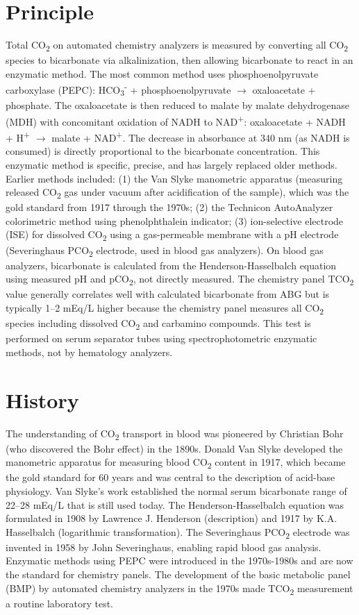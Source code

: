 \section*{Principle}
Total CO\textsubscript{2} on automated chemistry analyzers is measured by converting all CO\textsubscript{2} species to bicarbonate via alkalinization, then allowing bicarbonate to react in an enzymatic method. The most common method uses phosphoenolpyruvate carboxylase (PEPC): HCO\textsubscript{3}\textsuperscript{-} + phosphoenolpyruvate $\rightarrow$ oxaloacetate + phosphate. The oxaloacetate is then reduced to malate by malate dehydrogenase (MDH) with concomitant oxidation of NADH to NAD\textsuperscript{+}: oxaloacetate + NADH + H\textsuperscript{+} $\rightarrow$ malate + NAD\textsuperscript{+}. The decrease in absorbance at 340 nm (as NADH is consumed) is directly proportional to the bicarbonate concentration. This enzymatic method is specific, precise, and has largely replaced older methods. Earlier methods included: (1) the Van Slyke manometric apparatus (measuring released CO\textsubscript{2} gas under vacuum after acidification of the sample), which was the gold standard from 1917 through the 1970s; (2) the Technicon AutoAnalyzer colorimetric method using phenolphthalein indicator; (3) ion-selective electrode (ISE) for dissolved CO\textsubscript{2} using a gas-permeable membrane with a pH electrode (Severinghaus PCO\textsubscript{2} electrode, used in blood gas analyzers). On blood gas analyzers, bicarbonate is calculated from the Henderson-Hasselbalch equation using measured pH and pCO\textsubscript{2}, not directly measured. The chemistry panel TCO\textsubscript{2} value generally correlates well with calculated bicarbonate from ABG but is typically 1--2 mEq/L higher because the chemistry panel measures all CO\textsubscript{2} species including dissolved CO\textsubscript{2} and carbamino compounds. This test is performed on serum separator tubes using spectrophotometric enzymatic methods, not by hematology analyzers.

\section*{History}
The understanding of CO\textsubscript{2} transport in blood was pioneered by Christian Bohr (who discovered the Bohr effect) in the 1890s. Donald Van Slyke developed the manometric apparatus for measuring blood CO\textsubscript{2} content in 1917, which became the gold standard for 60 years and was central to the description of acid-base physiology. Van Slyke's work established the normal serum bicarbonate range of 22--28 mEq/L that is still used today. The Henderson-Hasselbalch equation was formulated in 1908 by Lawrence J. Henderson (description) and 1917 by K.A. Hasselbalch (logarithmic transformation). The Severinghaus PCO\textsubscript{2} electrode was invented in 1958 by John Severinghaus, enabling rapid blood gas analysis. Enzymatic methods using PEPC were introduced in the 1970s-1980s and are now the standard for chemistry panels. The development of the basic metabolic panel (BMP) by automated chemistry analyzers in the 1970s made TCO\textsubscript{2} measurement a routine laboratory test.

